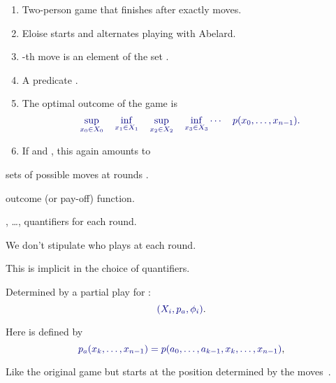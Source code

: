 \documentclass%
[%
Screen4to3,
]{foils}
\begin{document}
\begin{enumerate}
\item 
Two-person game that finishes after exactly  moves.

\item 
Eloise starts and alternates playing with Abelard. 

\item {}-th move is an element of the set .

\item A predicate .

\item  The optimal outcome of the game is
\[
\darkblue{\sup_{x_0 \in X_0} \quad \inf_{x_1 \in X_1} \quad \sup_{ x_{2} \in X_{2}} \quad \inf_{x_{3} \in X_{3}} \cdots \quad p(x_0, \ldots, x_{n-1}).}
\]

\item 
If  and ,
this again amounts to
\end{enumerate}



 sets of possible moves at rounds
.

 outcome (or pay-off) function.

, \dots,  quantifiers for each round.

\vfill

We don't stipulate who plays at each round.

This is implicit in the choice of quantifiers.



Determined by a partial play  for :
 \[ \darkblue{(X_i , p_{{a}}, \phi_i)}.\]  

\vfill

Here  is defined by
\[
\darkblue{p_{{a}}(x_k,\dots,x_{n-1}) =
  p(a_0,\dots,a_{k-1},x_k,\dots,x_{n-1})},
\]

\vfill

Like the original game but starts at the position determined by the
moves~.
\end{document}
